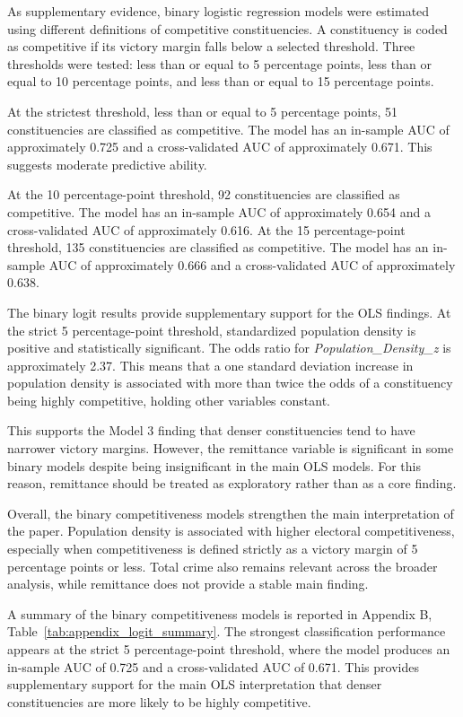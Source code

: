 \documentclass[12pt,a4paper]{article}
\begin{document}
As supplementary evidence, binary logistic regression models were estimated using different definitions of competitive constituencies. A constituency is coded as competitive if its victory margin falls below a selected threshold. Three thresholds were tested: less than or equal to 5 percentage points, less than or equal to 10 percentage points, and less than or equal to 15 percentage points.

At the strictest threshold, less than or equal to 5 percentage points, 51 constituencies are classified as competitive. The model has an in-sample AUC of approximately 0.725 and a cross-validated AUC of approximately 0.671. This suggests moderate predictive ability.

At the 10 percentage-point threshold, 92 constituencies are classified as competitive. The model has an in-sample AUC of approximately 0.654 and a cross-validated AUC of approximately 0.616. At the 15 percentage-point threshold, 135 constituencies are classified as competitive. The model has an in-sample AUC of approximately 0.666 and a cross-validated AUC of approximately 0.638.

The binary logit results provide supplementary support for the OLS findings. At the strict 5 percentage-point threshold, standardized population density is positive and statistically significant. The odds ratio for \textit{Population\_Density\_z} is approximately 2.37. This means that a one standard deviation increase in population density is associated with more than twice the odds of a constituency being highly competitive, holding other variables constant.

This supports the Model 3 finding that denser constituencies tend to have narrower victory margins. However, the remittance variable is significant in some binary models despite being insignificant in the main OLS models. For this reason, remittance should be treated as exploratory rather than as a core finding.

Overall, the binary competitiveness models strengthen the main interpretation of the paper. Population density is associated with higher electoral competitiveness, especially when competitiveness is defined strictly as a victory margin of 5 percentage points or less. Total crime also remains relevant across the broader analysis, while remittance does not provide a stable main finding.

A summary of the binary competitiveness models is reported in Appendix B, Table~\ref{tab:appendix_logit_summary}. The strongest classification performance appears at the strict 5 percentage-point threshold, where the model produces an in-sample AUC of 0.725 and a cross-validated AUC of 0.671. This provides supplementary support for the main OLS interpretation that denser constituencies are more likely to be highly competitive.
\end{document}
